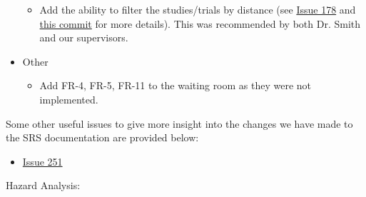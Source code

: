 \documentclass{article}
\begin{document}
\begin{itemize}
\begin{itemize}
              \item Add the ability to filter the studies/trials by distance (see \href{https://github.com/davimang/REACH/issues/178}{Issue 178} and \href{https://github.com/davimang/REACH/commit/8b6dd42a8c4585f0ac4a0efce1ea32024c65f6c0}{this commit} for more details). This was recommended by both Dr. Smith and our supervisors.
          \end{itemize}
    \item Other
          \begin{itemize}
              \item Add FR-4, FR-5, FR-11 to the waiting room as they were not implemented.
          \end{itemize}
\end{itemize}

Some other useful issues to give more insight into the changes we have made to the SRS documentation are provided below:

\begin{itemize}
    \item \href{https://github.com/davimang/REACH/issues/251}{Issue 251}\\
\end{itemize}

Hazard Analysis:
\end{document}
